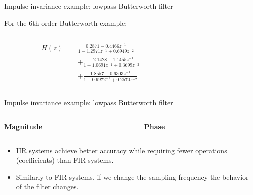 \documentclass[10pt]{beamer}
\begin{document}
%
\begin{frame}{Impulse invariance example: lowpass Butterworth filter}

For the 6th-order Butterworth example:

\begin{columns}
	\begin{column}{0.5\textwidth}
		\begin{align*}
		H(z) =& \frac{0.2871 -0.4466z^{-1}}{1 -1.2971z^{-1} + 0.6949z^{-2}} \\ &+\frac{-2.1428 +1.1455z^{-1}}{1 -1.0691z^{-1} + 0.3699z^{-2}}  \\
		&+\frac{1.8557 - 0.6303z^{-1}}{1 -0.9972^{-1} + 0.2570z^{-2}} 
		\end{align*}
	\end{column}
	
	\begin{column}{0.5\textwidth}
		\begin{center}
			\resizebox{\linewidth}{!}{}
		\end{center}
	\end{column}
\end{columns}
\end{frame}

%
\begin{frame}{Impulse invariance example: lowpass Butterworth filter}

\begin{columns}
	\begin{column}{0.5\textwidth}
		\textbf{Magnitude}
		\begin{center}
			\resizebox{\linewidth}{!}{}
		\end{center}
	\end{column}
	\begin{column}{0.5\textwidth}
		\textbf{Phase}
		\begin{center}
			\resizebox{\linewidth}{!}{}
		\end{center}
	\end{column}
\end{columns}

\begin{itemize}
	\item IIR systems achieve better accuracy while requiring fewer operations (coefficients) than FIR systems.
	\item Similarly to FIR systems, if we change the sampling frequency the behavior of the filter changes.
\end{itemize}
\end{frame}
\end{document}
